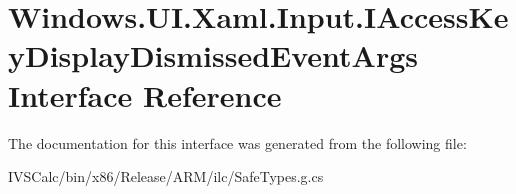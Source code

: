 \hypertarget{interface_windows_1_1_u_i_1_1_xaml_1_1_input_1_1_i_access_key_display_dismissed_event_args}{}\section{Windows.\+U\+I.\+Xaml.\+Input.\+I\+Access\+Key\+Display\+Dismissed\+Event\+Args Interface Reference}
\label{interface_windows_1_1_u_i_1_1_xaml_1_1_input_1_1_i_access_key_display_dismissed_event_args}


The documentation for this interface was generated from the following file\+:\begin{DoxyCompactItemize}
\item 
I\+V\+S\+Calc/bin/x86/\+Release/\+A\+R\+M/ilc/Safe\+Types.\+g.\+cs\end{DoxyCompactItemize}
